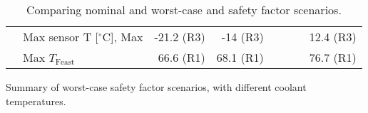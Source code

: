 \begin{table}[ht]
\begin{subtable}[t]{.99\linewidth}
\begin{centering}
{\begin{tabular}{|l|l|r|r|r|r|r|r|}
                                & Max sensor T [$^\circ$C], Max                &    -21.2 (R3) &     -14 (R3) &  & &  &     12.4 (R3) \\ 
                                & Max $T_\text{Feast}$                         &     66.6 (R1) &    68.1 (R1) &  & &  &     76.7 (R1) \\ 
\hline\end{tabular}
} %
\end{centering}
\caption{Summary of worst-case safety factor scenarios, with different coolant temperatures.}
\end{subtable}
\caption{Comparing nominal and worst-case and safety factor scenarios.}
\label{results_summary}
\end{table}
